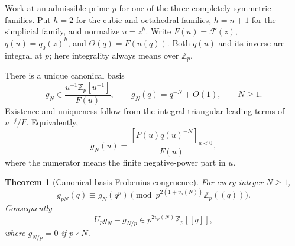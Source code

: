 \documentclass[11pt,a4paper]{article}
\newtheorem{theorem}{Theorem}[section]
\theoremstyle{definition}\newtheorem{definition}[theorem]{Definition}
\theoremstyle{remark}\newtheorem{remark}[theorem]{Remark}
\numberwithin{equation}{section}
\begin{document}
Work at an admissible prime \(p\) for one of the three completely
symmetric families.  Put \(h=2\) for the cubic and octahedral families,
\(h=n+1\) for the simplicial family, and normalize \(u=z^h\).
Write \(F(u)=\mathcal F(z)\), \(q(u)=q_0(z)^h\), and
\(\Theta(q)=F(u(q))\).  Both \(q(u)\) and its inverse are integral
at \(p\); here integrality always means over \(\mathbb Z_p\).

There is a unique canonical basis
\[
 g_N\in\frac{u^{-1}\mathbb Z_p[u^{-1}]}{F(u)},\qquad
 g_N(q)=q^{-N}+O(1),\qquad N\geq1.
\]
Existence and uniqueness follow from the integral triangular leading
terms of \(u^{-j}/F\).  Equivalently,
\[
 g_N(u)=\frac{[F(u)q(u)^{-N}]_{u<0}}{F(u)},
\]
where the numerator means the finite negative-power part in \(u\).

\begin{theorem}[Canonical-basis Frobenius congruence]
\label{T:thm:negative-basis-frob}
For every integer \(N\geq1\),
\[
 g_{pN}(q)\equiv g_N(q^p)
 \pmod{p^{2(1+v_p(N))}\mathbb Z_p((q))}.
\]
Consequently
\[
 U_pg_N-g_{N/p}
 \in p^{2v_p(N)}\mathbb Z_p[[q]],
\]
where \(g_{N/p}=0\) if \(p\nmid N\).
\end{theorem}
\end{document}
